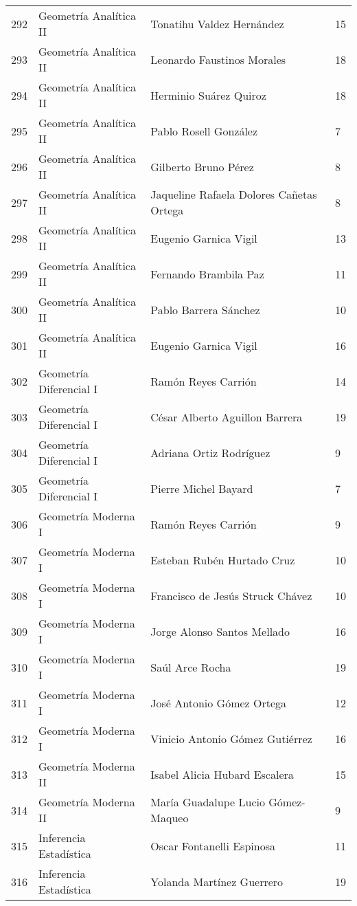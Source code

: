 \begin{table}[ht]
\begin{tabular}{rlll}
  292 & Geometría Analítica II & Tonatihu Valdez Hernández & 15 \\ 
  293 & Geometría Analítica II & Leonardo Faustinos Morales & 18 \\ 
  294 & Geometría Analítica II & Herminio Suárez Quiroz & 18 \\ 
  295 & Geometría Analítica II & Pablo Rosell González & 7 \\ 
  296 & Geometría Analítica II & Gilberto Bruno Pérez & 8 \\ 
  297 & Geometría Analítica II & Jaqueline Rafaela Dolores Cañetas Ortega & 8 \\ 
  298 & Geometría Analítica II & Eugenio Garnica Vigil & 13 \\ 
  299 & Geometría Analítica II & Fernando Brambila Paz & 11 \\ 
  300 & Geometría Analítica II & Pablo Barrera Sánchez & 10 \\ 
  301 & Geometría Analítica II & Eugenio Garnica Vigil & 16 \\ 
  302 & Geometría Diferencial I & Ramón Reyes Carrión & 14 \\ 
  303 & Geometría Diferencial I & César Alberto Aguillon Barrera & 19 \\ 
  304 & Geometría Diferencial I & Adriana Ortiz Rodríguez & 9 \\ 
  305 & Geometría Diferencial I & Pierre Michel Bayard & 7 \\ 
  306 & Geometría Moderna I & Ramón Reyes Carrión & 9 \\ 
  307 & Geometría Moderna I & Esteban Rubén Hurtado Cruz & 10 \\ 
  308 & Geometría Moderna I & Francisco de Jesús Struck Chávez & 10 \\ 
  309 & Geometría Moderna I & Jorge Alonso Santos Mellado & 16 \\ 
  310 & Geometría Moderna I & Saúl Arce Rocha & 19 \\ 
  311 & Geometría Moderna I & José Antonio Gómez Ortega & 12 \\ 
  312 & Geometría Moderna I & Vinicio Antonio Gómez Gutiérrez & 16 \\ 
  313 & Geometría Moderna II & Isabel Alicia Hubard Escalera & 15 \\ 
  314 & Geometría Moderna II & María Guadalupe Lucio Gómez-Maqueo & 9 \\ 
  315 & Inferencia Estadística & Oscar Fontanelli Espinosa & 11 \\ 
  316 & Inferencia Estadística & Yolanda Martínez Guerrero & 19 \\ 

\end{tabular}
\end{table}

